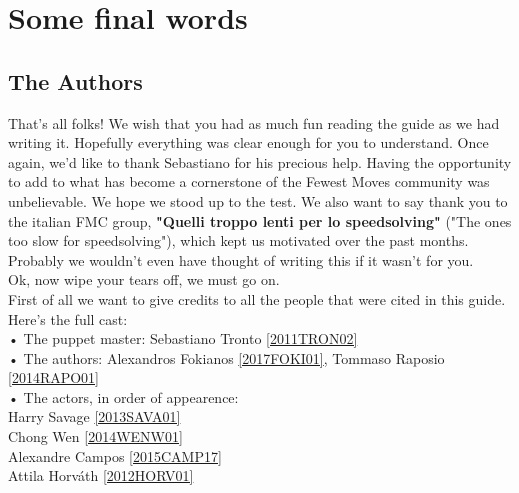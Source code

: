 \documentclass[11pt,a4paper]{book}
\begin{document}
\chapter{Some final words}

\section{The Authors}

That's all folks! We wish that you had as much fun reading the guide as we had writing it. Hopefully everything was clear enough for you to understand. 
Once again, we'd like to thank Sebastiano for his precious help. Having the opportunity to add to what has become a cornerstone of the Fewest Moves community was unbelievable. We hope we stood up to the test. We also want to say thank you to the italian FMC group, \textbf{"Quelli troppo lenti per lo speedsolving"} ("The ones too slow for speedsolving"), which kept us motivated over the past months. Probably we wouldn't even have thought of writing this if it wasn't for you. \\
Ok, now wipe your tears off, we must go on.\\
\newline
First of all we want to give credits to all the people that were cited in this guide.\\
Here's the full cast:\\
\newline
• The puppet master: Sebastiano Tronto \href{https://www.worldcubeassociation.org/persons/2011TRON02}{[2011TRON02]}\\
\newline
• The authors: Alexandros Fokianos \href{https://www.worldcubeassociation.org/persons/2017FOKI01}{[2017FOKI01]}, Tommaso Raposio \href{https://www.worldcubeassociation.org/persons/2014RAPO01}{[2014RAPO01]}\\
\newline
• The actors, in order of appearence:\\
\newline
Harry Savage \href{https://www.worldcubeassociation.org/persons/2013SAVA01}{[2013SAVA01]} \\
Chong Wen \href{https://www.worldcubeassociation.org/persons/2014WENW01}{[2014WENW01]} \\
Alexandre Campos \href{https://www.worldcubeassociation.org/persons/2015CAMP17}{[2015CAMP17]}\\
Attila Horváth \href{https://www.worldcubeassociation.org/persons/2012HORV01}{[2012HORV01]}\\
\end{document}
